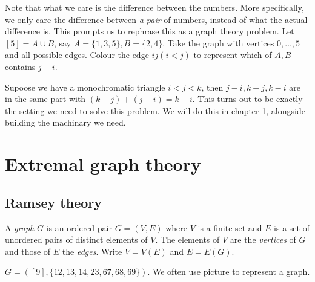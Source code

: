 \documentclass[a4paper]{article}
\begin{document}
Note that what we care is the difference between the numbers. More specifically, we only care the difference between \emph{a pair} of numbers, instead of what the actual difference is. This prompts us to rephrase this as a graph theory problem. Let \([5] = A \cup B\), say \(A = \{1, 3, 5\}, B = \{2, 4\}\). Take the graph with vertices \(0, \dots, 5\) and all possible edges. Colour the edge \(ij (i < j)\) to represent which of \(A, B\) contains \(j - i\).

\begin{center}
\end{center}

Supoose we have a monochromatic triangle \(i < j < k\), then \(j - i, k - j, k - i\) are in the same part with \((k - j) + (j - i) = k - i\). This turns out to be exactly the setting we need to solve this problem. We will do this in chapter 1, alongside building the machinary we need.

\section{Extremal graph theory}

\subsection{Ramsey theory}

\begin{definition}
  A \emph{graph} \(G\) is an ordered pair \(G = (V, E)\) where \(V\) is a finite set and \(E\) is a set of unordered pairs of distinct elements of \(V\). The elements of \(V\) are the \emph{vertices} of \(G\) and those of \(E\) the \emph{edges}. Write \(V = V(E)\) and \(E = E(G)\).
\end{definition}

\begin{eg}
  \(G = ([9], \{12, 13, 14, 23, 67, 68, 69\})\). We often use picture to represent a graph.
  \begin{center}
  \end{center}
\end{eg}
\end{document}
